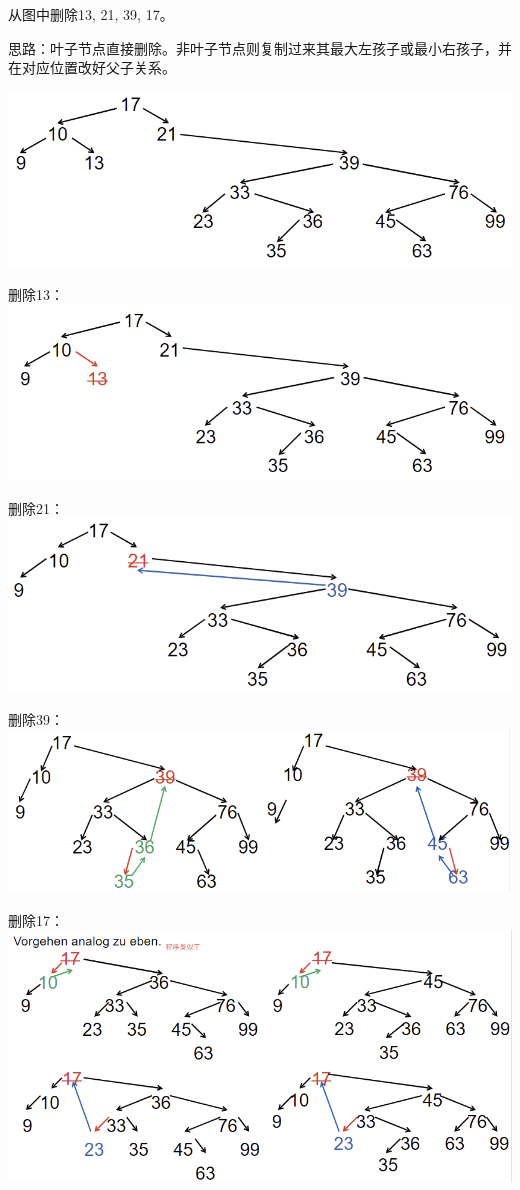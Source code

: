 \documentclass[fleqn]{article}
\begin{document}
从图中删除13, 21, 39, 17。

思路：叶子节点直接删除。非叶子节点则复制过来其最大左孩子或最小右孩子，并在对应位置改好父子关系。

\begin{center}
    \includegraphics[scale=0.5]{23.png}

    删除13：
    \includegraphics[scale=0.5]{24.png}

    删除21：
    \includegraphics[scale=0.5]{25.png}

    删除39：
    \includegraphics[scale=0.5]{26.png}

    删除17：
    \includegraphics[scale=0.5]{27.png}


\end{center}
\end{document}
